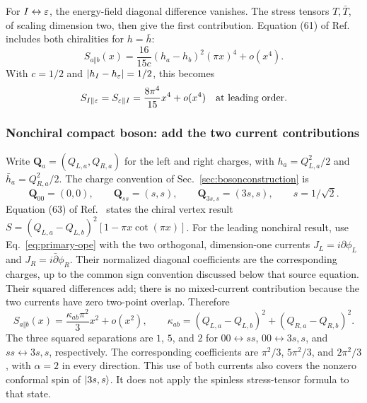For $I\leftrightarrow\varepsilon$, the energy-field diagonal difference
vanishes. The stress tensors $T,\bar T$, of scaling dimension two,
then give the first contribution. Equation (61) of Ref.~\cite{Sarosi}
includes both chiralities for $h=\bar h$:
\begin{equation}
 S_{a\Vert b}(x)=\frac{16}{15c}(h_a-h_b)^2(\pi x)^4+o(x^4).
 \label{eq:primary-stress}
\end{equation}
With $c=1/2$ and $|h_I-h_\varepsilon|=1/2$, this becomes
\begin{equation}
 S_{I\Vert\varepsilon}=S_{\varepsilon\Vert I}
 =\frac{8\pi^4}{15}x^4+o(x^4)
 \quad\text{at leading order}.
 \label{eq:primary-ising-energy}
\end{equation}

\subsubsection{Nonchiral compact boson: add the two current contributions}
Write $\boldsymbol Q_a=(Q_{L,a},Q_{R,a})$ for the left and right
charges, with $h_a=Q_{L,a}^2/2$ and $\bar h_a=Q_{R,a}^2/2$.
The charge convention of Sec.~\ref{sec:bosonconstruction} is
\begin{equation}
 \boldsymbol Q_{00}=(0,0),\qquad
 \boldsymbol Q_{ss}=(s,s),\qquad
 \boldsymbol Q_{3s,s}=(3s,s),\qquad s=1/\sqrt2.
 \label{eq:primary-boson-charges}
\end{equation}
Equation (63) of Ref.~\cite{Sarosi} states the chiral vertex result
$S=(Q_{L,a}-Q_{L,b})^2[1-\pi x\cot(\pi x)]$.
For the leading nonchiral result, use Eq.~\eqref{eq:primary-ope} with
the two orthogonal, dimension-one currents $J_L=i\partial\phi_L$ and
$J_R=i\bar\partial\phi_R$. Their normalized diagonal coefficients
are the corresponding charges, up to the common sign convention
discussed below that source equation. Their squared differences add;
there is no mixed-current contribution because the two currents have
zero two-point overlap. Therefore
\begin{equation}
 S_{a\Vert b}(x)=\frac{\kappa_{ab}\pi^2}{3}x^2+o(x^2),
 \qquad \kappa_{ab}=(Q_{L,a}-Q_{L,b})^2+(Q_{R,a}-Q_{R,b})^2.
 \label{eq:primary-boson-leading}
\end{equation}
The three squared separations are $1$, $5$, and $2$ for
$00\leftrightarrow ss$, $00\leftrightarrow3s,s$, and
$ss\leftrightarrow3s,s$, respectively. The corresponding coefficients
are $\pi^2/3$, $5\pi^2/3$, and $2\pi^2/3$, with $\alpha=2$ in every direction.
This use of both currents also covers the nonzero conformal spin of
$\lvert 3s,s\rangle$. It does not apply the spinless stress-tensor formula to
that state.

